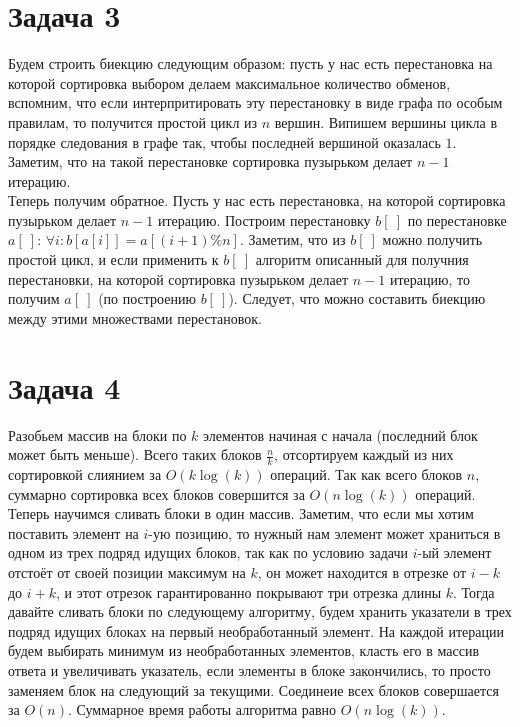 \documentclass{article}
\begin{document}
	\section*{Задача 3}
	Будем строить биекцию следующим образом: пусть у нас есть перестановка на которой сортировка выбором делаем максимальное количество обменов, вспомним, что если интерпритировать эту перестановку в виде графа по особым правилам, то получится простой цикл из $n$ вершин. Випишем вершины цикла в порядке следования в графе так, чтобы последней вершиной оказалась $1$. Заметим, что на такой перестановке сортировка пузырьком делает $n - 1$ итерацию.
	\\
	Теперь получим обратное. Пусть у нас есть перестановка, на которой сортировка пузырьком делает $n - 1$ итерацию. Построим перестановку $b[\ ]$ по перестановке $a[\ ]$: $\forall i: b[a[i]] = a[(i + 1) \% n]$. Заметим, что из $b[\ ]$ можно получить простой цикл, и если применить к $b[\ ]$ алгоритм описанный для получния перестановки, на которой сортировка пузырьком делает $n - 1$ итерацию, то получим $a[\ ]$ (по построению $b[\ ]$). Следует, что можно составить биекцию между этими множествами перестановок.
	
	\section*{Задача 4}
	Разобьем массив на блоки по $k$ элементов начиная с начала (последний блок может быть меньше). Всего таких блоков $\frac{n}{k}$, отсортируем каждый из них сортировкой слиянием за $O(k\log(k))$ операций. Так как всего блоков $n$, суммарно сортировка всех блоков совершится за $O(n\log(k))$ операций. Теперь научимся сливать блоки в один массив. Заметим, что если мы хотим поставить элемент на $i$-ую позицию, то нужный нам элемент может храниться в одном из трех подряд идущих блоков, так как по условию задачи $i$-ый элемент отстоёт от своей позиции максимум на $k$, он может находится в отрезке от $i - k$ до $i + k$, и этот отрезок гарантированно покрывают три отрезка длины $k$. Тогда давайте сливать блоки по следующему алгоритму, будем хранить указатели в трех подряд идущих блоках на первый необработанный элемент. На каждой итерации будем выбирать минимум из необработанных элементов, класть его в массив ответа и увеличивать указатель, если элементы в блоке закончились, то просто заменяем блок на следующий за текущими. Соединеие всех блоков совершается за $O(n)$. Суммарное время работы алгоритма равно $O(n\log(k))$.
	
\end{document}
